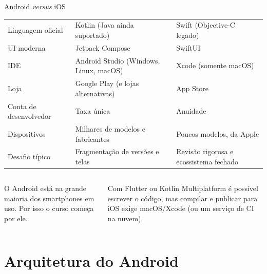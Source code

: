 \documentclass[aspectratio=169,10pt]{beamer}
\begin{document}
\begin{frame}{Android \emph{versus} iOS}
  \footnotesize
  \begin{tabularx}{\textwidth}{@{}l L L@{}}
    \toprule
    &  &  \\
    \midrule
    Linguagem oficial & Kotlin (Java ainda suportado) & Swift (Objective-C legado) \\
    UI moderna & Jetpack Compose & SwiftUI \\
    IDE & Android Studio (Windows, Linux, macOS) & Xcode (somente macOS) \\
    Loja & Google Play (e lojas alternativas) & App Store \\
    Conta de desenvolvedor & Taxa única & Anuidade \\
    Dispositivos & Milhares de modelos e fabricantes & Poucos modelos, da Apple \\
    Desafio típico & Fragmentação de versões e telas & Revisão rigorosa e ecossistema fechado \\
    \bottomrule
  \end{tabularx}
  \vspace{4pt}
  \begin{columns}[T]
    \begin{column}{0.48\textwidth}
      \begin{conceito}[No Brasil]
        O Android está na grande maioria dos smartphones em uso. Por isso o curso começa por ele.
      \end{conceito}
    \end{column}
    \begin{column}{0.48\textwidth}
      \begin{dica}
        Com Flutter ou Kotlin Multiplatform é possível escrever o código, mas compilar e publicar para iOS exige macOS/Xcode (ou um serviço de CI na nuvem).
      \end{dica}
    \end{column}
  \end{columns}
\end{frame}

\section{Arquitetura do Android}
\end{document}
